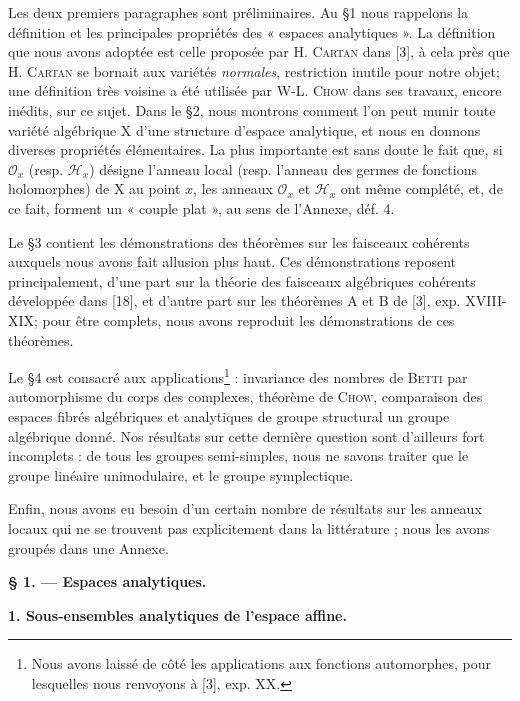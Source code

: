Les deux premiers paragraphes sont préliminaires. Au \S 1 nous rappelons la définition et les principales propriétés des « espaces analytiques ». La définition que nous avons adoptée est celle proposée par H. \textsc{Cartan} dans [3], à cela près que H. \textsc{Cartan} se bornait aux variétés \textit{normales}, restriction inutile pour notre objet; une définition très voisine a été utilisée par W-L. \textsc{Chow} dans ses travaux, encore inédits, sur ce sujet. Dans le \S 2, nous montrons comment l'on peut munir toute variété algébrique $\mathrm{X}$ d'une structure d'espace analytique, et nous en donnons diverses propriétés élémentaires. La plus importante est sans doute le fait que, si $\mathcal{O}_x$ (resp. $\mathcal{H}_x$) désigne l'anneau local (resp. l'anneau des germes de fonctions holomorphes) de $\mathrm{X}$ au point $x$, les anneaux $\mathcal{O}_x$ et $\mathcal{H}_x$ ont même complété, et, de ce fait, forment un « couple plat », au sens de l'Annexe, déf. 4.

Le \S 3 contient les démonstrations des théorèmes sur les faisceaux cohérents auxquels nous avons fait allusion plus haut. Ces démonstrations reposent principalement, d'une part sur la théorie des faisceaux algébriques cohérents développée dans [18], et d'autre part sur les théorèmes A et B de [3], exp. XVIII-XIX; pour être complets, nous avons reproduit les démonstrations de ces théorèmes.

Le \S 4 est consacré aux applications\footnote{Nous avons laissé de côté les applications aux fonctions automorphes, pour lesquelles nous renvoyons à [3], exp. XX.} : invariance des nombres de \textsc{Betti} par automorphisme du corps des complexes, théorème de \textsc{Chow}, comparaison des espaces fibrés algébriques et analytiques de groupe structural un groupe algébrique donné. Nos résultats sur cette dernière question sont d'ailleurs fort incomplets : de tous les groupes semi-simples, nous ne savons traiter que le groupe linéaire unimodulaire, et le groupe symplectique.



Enfin, nous avons eu besoin d'un certain nombre de résultats sur les anneaux locaux qui ne se trouvent pas explicitement dans la littérature ; nous les avons groupés dans une Annexe.


\begin{center}\bfseries § 1. — Espaces analytiques.\end{center}


\textbf{1. Sous-ensembles analytiques de l'espace affine.}

